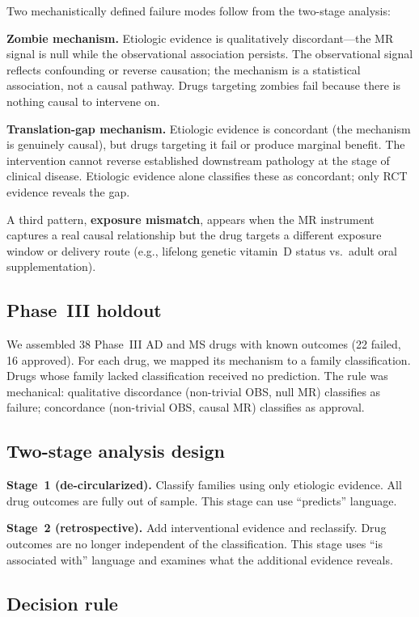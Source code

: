\documentclass[11pt]{article}
\begin{document}
Two mechanistically defined failure modes follow from the two-stage analysis:

\textbf{Zombie mechanism.} Etiologic evidence is qualitatively discordant---the MR signal is null while the observational association persists. The observational signal reflects confounding or reverse causation; the mechanism is a statistical association, not a causal pathway. Drugs targeting zombies fail because there is nothing causal to intervene on.

\textbf{Translation-gap mechanism.} Etiologic evidence is concordant (the mechanism is genuinely causal), but drugs targeting it fail or produce marginal benefit. The intervention cannot reverse established downstream pathology at the stage of clinical disease. Etiologic evidence alone classifies these as concordant; only RCT evidence reveals the gap.

A third pattern, \textbf{exposure mismatch}, appears when the MR instrument captures a real causal relationship but the drug targets a different exposure window or delivery route (e.g., lifelong genetic vitamin~D status vs.\ adult oral supplementation).

\subsection{Phase~III holdout}

We assembled 38 Phase~III AD and MS drugs with known outcomes (22 failed, 16 approved). For each drug, we mapped its mechanism to a family classification. Drugs whose family lacked classification received no prediction. The rule was mechanical: qualitative discordance (non-trivial OBS, null MR) classifies as failure; concordance (non-trivial OBS, causal MR) classifies as approval.

\subsection{Two-stage analysis design}

\textbf{Stage~1 (de-circularized).} Classify families using only etiologic evidence. All drug outcomes are fully out of sample. This stage can use ``predicts'' language.

\textbf{Stage~2 (retrospective).} Add interventional evidence and reclassify. Drug outcomes are no longer independent of the classification. This stage uses ``is associated with'' language and examines what the additional evidence reveals.

\subsection{Decision rule}
\end{document}
